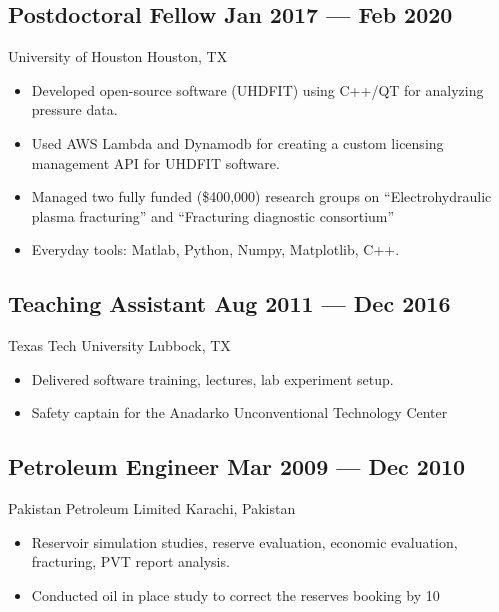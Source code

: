 \documentclass[letter,10pt]{article}
\newcommand{\subtext}[1]{
	#1\par\vspace{-0.2cm}}
\newenvironment{zitemize}{
	\begin{itemize}\itemsep0pt \parskip0pt \parsep1pt}
	{\end{itemize}\vspace{-0.5cm}}
\begin{document}
	\subsection*{Postdoctoral Fellow \hfill Jan 2017 --- Feb 2020} 
	\subtext{University of Houston \hfill Houston, TX} 
	\begin{zitemize}
		\item Developed open-source software (UHDFIT) using C++/QT for analyzing pressure data.
		\item Used AWS Lambda and Dynamodb for creating a custom licensing management API for UHDFIT software.
		\item Managed two fully funded (\$400,000) research groups on “Electrohydraulic plasma fracturing” and 
		“Fracturing diagnostic consortium”
		\item Everyday tools: Matlab, Python, Numpy, Matplotlib, C++.
	\end{zitemize}

	\vspace{0.3 cm}
	\subsection*{Teaching Assistant \hfill Aug 2011 --- Dec 2016} 
	\subtext{Texas Tech University \hfill Lubbock, TX} 
	\begin{zitemize}
		\item Delivered software training, lectures, lab experiment setup.
		\item Safety captain for the Anadarko Unconventional Technology Center
	\end{zitemize}

	\vspace{0.3 cm}
	\subsection*{Petroleum Engineer \hfill Mar 2009 --- Dec 2010} 
	\subtext{Pakistan Petroleum Limited \hfill Karachi, Pakistan} 
	\begin{zitemize}
		\item Reservoir simulation studies, reserve evaluation, economic evaluation, fracturing, PVT report analysis.
		\item Conducted oil in place study to correct the reserves booking by 10%
	\end{zitemize}
	
\end{document}
